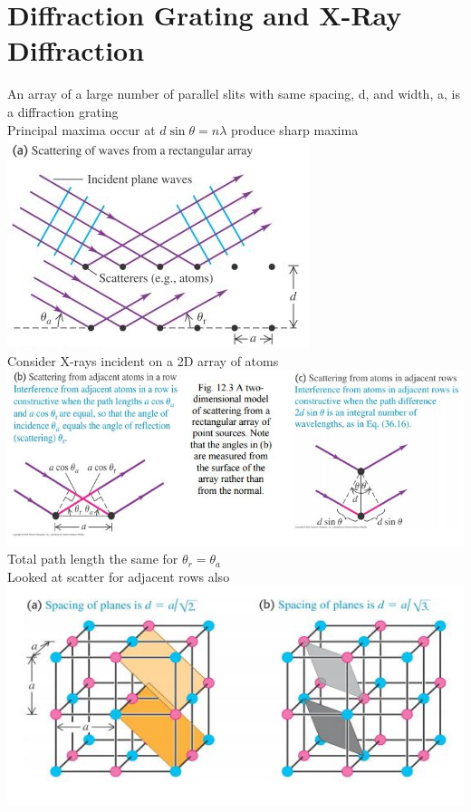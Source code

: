 \documentclass[a4paper, 11pt, fleqn, normalem]{report}
\begin{document}
\section{Diffraction Grating and X-Ray Diffraction}
An array of a large number of parallel slits with same spacing, d, and width, a, is a diffraction grating \\
Principal maxima occur at $d\sin{\theta} = n\lambda$ produce sharp maxima \\
\includegraphics{Grat1.jpg} \\
Consider X-rays incident on a 2D array of atoms \\
\includegraphics[width=\textwidth]{Scatter.jpg} \\
Total path length the same for $\theta_{r} = \theta_{a}$ \\
Looked at scatter for adjacent rows also \\
\includegraphics{Crystals.jpg}
\end{document}
